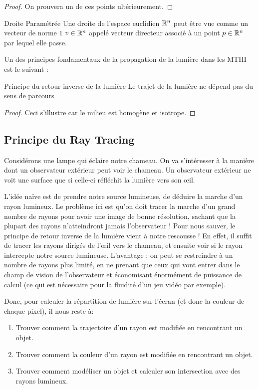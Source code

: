 \documentclass{classe}
\begin{document}
\begin{proof}
	On prouvera un de ces points ultérieurement.
\end{proof}
\begin{propositionfr}{Droite Paramétrée}{}
	Une droite de l'espace euclidien $\mathbb{R}^{n}$ peut être vue comme un vecteur de norme $1$ $v \in \mathbb{R}^{n}$ appelé vecteur directeur associé à un point $p \in \mathbb{R}^{n}$ par lequel elle passe.
\end{propositionfr}
Un des principes fondamentaux de la propagation de la lumière dans les MTHI est le suivant :
\begin{théorème}{Principe du retour inverse de la lumière}{}
Le trajet de la lumière ne dépend pas du sens de parcours
\end{théorème}
\begin{proof}
	Ceci s'illustre car le milieu est homogène et isotrope.
\end{proof}


\subsection{Principe du Ray Tracing}
Considérons une lampe qui éclaire notre chameau. On va s'intéresser à la manière dont un observateur extérieur peut voir le chameau.
Un observateur extérieur ne voit une surface que si celle-ci réfléchit la lumière vers son \oe il.

L'idée naïve est de prendre notre source lumineuse, de déduire la marche d'un rayon lumineux.
Le problème ici est qu'on doit tracer la marche d'un grand nombre de rayons pour avoir une image de bonne résolution, sachant que la plupart des rayons n'atteindront jamais l'observateur !
Pour nous sauver, le principe de retour inverse de la lumière vient à notre rescousse ! En effet, il suffit de tracer les rayons dirigés de l'\oe il vers le chameau, et ensuite voir si le rayon intercepte notre source lumineuse.
L'avantage : on peut se restreindre à un nombre de rayons plus limité, en ne prenant que ceux qui vont entrer dans le champ de vision de l'observateur et économisant énormément de puissance de calcul (ce qui est nécessaire pour la fluidité d'un jeu vidéo par exemple).

Donc, pour calculer la répartition de lumière sur l'écran (et donc la couleur de chaque pixel), il nous reste à:
\begin{enumerate}
	\item Trouver comment la trajectoire d'un rayon est modifiée en rencontrant un objet.
	\item Trouver comment la couleur d'un rayon est modifiée en rencontrant un objet.
	\item Trouver comment modéliser un objet et calculer son intersection avec des rayons lumineux.
\end{enumerate}
\end{document}

